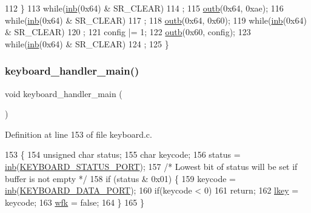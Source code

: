 \begin{DoxyCode}
112     \}
113     \textcolor{keywordflow}{while}(\hyperlink{a00164_a0223c8898dfec29069879dc51076e28a_a0223c8898dfec29069879dc51076e28a}{inb}(0x64) & SR\_CLEAR)
114         ;
115     \hyperlink{a00164_aa37f5841c54156a4b14fc0d6f626b44f_aa37f5841c54156a4b14fc0d6f626b44f}{outb}(0x64, 0xae);
116     \textcolor{keywordflow}{while}(\hyperlink{a00164_a0223c8898dfec29069879dc51076e28a_a0223c8898dfec29069879dc51076e28a}{inb}(0x64) & SR\_CLEAR)
117         ;
118     \hyperlink{a00164_aa37f5841c54156a4b14fc0d6f626b44f_aa37f5841c54156a4b14fc0d6f626b44f}{outb}(0x64, 0x60);
119     \textcolor{keywordflow}{while}(\hyperlink{a00164_a0223c8898dfec29069879dc51076e28a_a0223c8898dfec29069879dc51076e28a}{inb}(0x64) & SR\_CLEAR)
120         ;
121     config |= 1;
122     \hyperlink{a00164_aa37f5841c54156a4b14fc0d6f626b44f_aa37f5841c54156a4b14fc0d6f626b44f}{outb}(0x60, config);
123     \textcolor{keywordflow}{while}(\hyperlink{a00164_a0223c8898dfec29069879dc51076e28a_a0223c8898dfec29069879dc51076e28a}{inb}(0x64) & SR\_CLEAR)
124         ;
125 \}
\end{DoxyCode}
\mbox{\label{a00041_adffe6abc4a32b3b10985ec9324bce2af_adffe6abc4a32b3b10985ec9324bce2af}} 
\subsubsection{\texorpdfstring{keyboard\+\_\+handler\+\_\+main()}{keyboard\_handler\_main()}}
{\footnotesize\ttfamily void keyboard\+\_\+handler\+\_\+main (\begin{DoxyParamCaption}{ }\end{DoxyParamCaption})}



Definition at line 153 of file keyboard.\+c.


\begin{DoxyCode}
153                                  \{
154     \textcolor{keywordtype}{unsigned} \textcolor{keywordtype}{char} status;
155     \textcolor{keywordtype}{char} keycode;
156     status = \hyperlink{a00164_a0223c8898dfec29069879dc51076e28a_a0223c8898dfec29069879dc51076e28a}{inb}(\hyperlink{a00041_ab79ca089665bc7f5cc151883d1bc69ed_ab79ca089665bc7f5cc151883d1bc69ed}{KEYBOARD\_STATUS\_PORT});
157     \textcolor{comment}{/* Lowest bit of status will be set if buffer is not empty */}
158     \textcolor{keywordflow}{if} (status & 0x01) \{
159         keycode = \hyperlink{a00164_a0223c8898dfec29069879dc51076e28a_a0223c8898dfec29069879dc51076e28a}{inb}(\hyperlink{a00041_a49e0a04e81098085d2948c1e9f8c99cb_a49e0a04e81098085d2948c1e9f8c99cb}{KEYBOARD\_DATA\_PORT});
160         \textcolor{keywordflow}{if}(keycode < 0)
161             \textcolor{keywordflow}{return};
162         \hyperlink{a00038_ade374650022cb30c4f5591a8dafad685_ade374650022cb30c4f5591a8dafad685}{lkey} = keycode;
163         \hyperlink{a00038_a6ddd5223379778858edc46ffbec19775_a6ddd5223379778858edc46ffbec19775}{wfk} = \textcolor{keyword}{false};
164     \}
165 \}
\end{DoxyCode}
